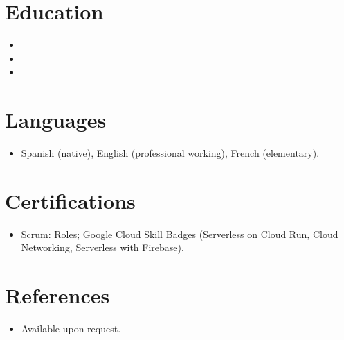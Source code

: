 \documentclass[11pt,a4paper,sans]{moderncv}
\begin{document}

\section{Education}
\vspace{1pt}
\begin{itemize}

\item{}

\vspace{3pt}

\item{}

\vspace{3pt}

\item{}

\end{itemize}


\section{Languages}
\vspace{1pt}
\begin{itemize}
\item Spanish (native), English (professional working), French (elementary).
\end{itemize}


\section{Certifications}
\vspace{1pt}
\begin{itemize}
\item Scrum: Roles; Google Cloud Skill Badges (Serverless on Cloud Run, Cloud Networking, Serverless with Firebase).
\end{itemize}


\section{References}
\vspace{1pt}
\begin{itemize}
\item{Available upon request.}
\end{itemize}
\end{document}
